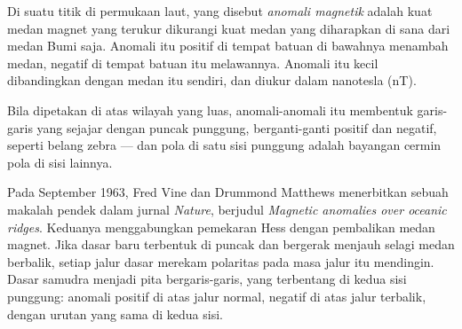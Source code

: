 \begin{definition}\label{def:g11:drift-to-spreading:anomaly}
Di suatu titik di permukaan laut, yang disebut
\emph{anomali magnetik} adalah kuat medan magnet yang
terukur dikurangi kuat medan yang diharapkan di sana dari medan Bumi saja.
Anomali itu positif di tempat batuan di bawahnya menambah medan, negatif di
tempat batuan itu melawannya. Anomali itu kecil dibandingkan dengan medan itu
sendiri, dan diukur dalam nanotesla (\unit{nT}).
\end{definition}

Bila dipetakan di atas wilayah yang luas, anomali-anomali itu membentuk
garis-garis yang sejajar dengan puncak punggung, berganti-ganti positif dan
negatif, seperti belang zebra --- dan pola di satu sisi punggung adalah
bayangan cermin pola di sisi lainnya.

\begin{history}
Pada September 1963, Fred Vine dan Drummond Matthews menerbitkan sebuah
makalah pendek dalam jurnal \emph{Nature}, berjudul
\emph{Magnetic anomalies over oceanic ridges}. Keduanya menggabungkan
pemekaran Hess dengan pembalikan medan magnet. Jika dasar baru terbentuk di
puncak dan bergerak menjauh selagi medan berbalik, setiap jalur dasar merekam
polaritas pada masa jalur itu mendingin. Dasar samudra menjadi pita
bergaris-garis, yang terbentang di kedua sisi punggung: anomali positif di
atas jalur normal, negatif di atas jalur terbalik, dengan urutan yang sama di
kedua sisi.
\end{history}

